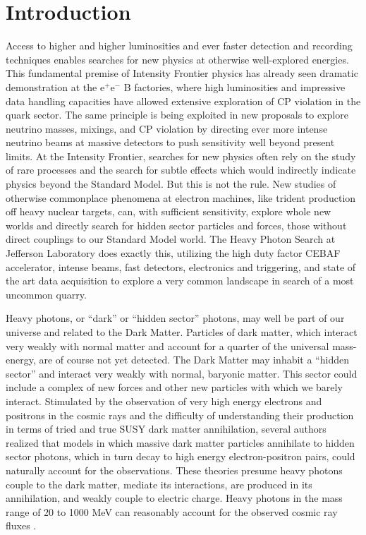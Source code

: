 \section{Introduction}

Access to higher and higher luminosities and ever faster detection and recording  techniques enables  searches for new physics at otherwise well-explored energies. This fundamental premise of Intensity Frontier physics has already seen dramatic demonstration at the e$^+$e$^-$ B factories, where high luminosities and impressive data handling capacities have allowed extensive exploration of CP violation in the quark sector. The same principle is being exploited in new proposals to explore neutrino masses, mixings, and CP violation by directing ever more intense neutrino beams at massive detectors to push sensitivity well beyond present limits. At the Intensity Frontier, searches for new physics often rely on the study of rare processes and the search for subtle effects which would indirectly indicate physics beyond the Standard Model. But this is not the rule. New studies of otherwise commonplace phenomena at electron machines, like trident production off heavy nuclear targets, can, with sufficient sensitivity, explore whole new worlds and directly search for hidden sector particles and forces, those without direct couplings to our Standard Model world. The Heavy Photon Search at Jefferson Laboratory does exactly this, utilizing the high duty factor CEBAF accelerator, intense beams, fast detectors, electronics and triggering, and state of the art data acquisition to explore a very common landscape in search of a most uncommon quarry.

Heavy photons, or ``dark'' or ``hidden sector'' photons, may well be part of our universe and related to the Dark Matter. Particles of dark matter, which interact very weakly with normal matter and account for a quarter of the universal mass-energy, are of course not yet detected. The Dark Matter may inhabit a ``hidden sector'' and interact very weakly with normal, baryonic matter. This sector could include a complex of new forces and other new particles with which we barely interact.  Stimulated by the observation of very high energy electrons and positrons in the cosmic rays and the difficulty of understanding their production in terms of tried and true SUSY dark matter annihilation, several authors \cite{ArkaniHamed:2008qn}\cite{Pospelov:2008jd} realized that models in which massive dark matter particles annihilate to hidden sector photons, which in turn decay to high energy electron-positron pairs, could naturally account for the observations. These theories presume heavy photons couple to the dark matter, mediate its interactions, are produced  in its annihilation, and weakly couple to electric charge. Heavy photons in the mass range of 20 to 1000 MeV  can reasonably account for the observed cosmic ray fluxes \cite {Finkbeiner:2010sm}. 

